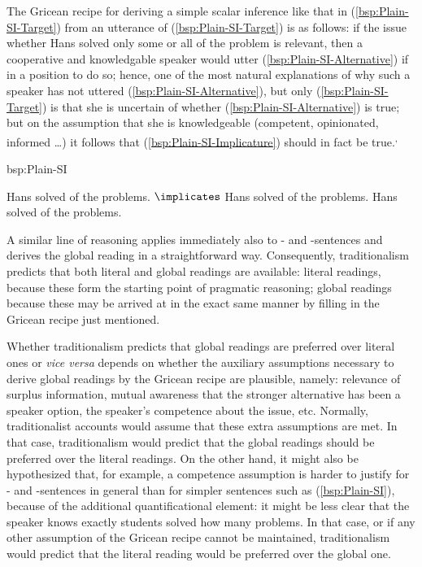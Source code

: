 \documentclass[fleqn,reqno,10pt,draft]{article}
\newcommand{\as}{\acro{as}}
\renewcommand{\es}{\acro{es}}
\newcommand{\mymark}[1]{{\color{mycol}{#1}}}
\begin{document}
The Gricean recipe for deriving a simple scalar inference like that in
(\ref{bsp:Plain-SI-Target}) from an utterance of
(\ref{bsp:Plain-SI-Target}) is as follows: if the issue whether Hans
solved only some or all of the problem is relevant, then a cooperative
and knowledgable speaker would utter (\ref{bsp:Plain-SI-Alternative})
if in a position to do so; hence, one of the most natural explanations
of why such a speaker has not uttered
(\ref{bsp:Plain-SI-Alternative}), but only (\ref{bsp:Plain-SI-Target})
is that she is uncertain of whether (\ref{bsp:Plain-SI-Alternative})
is true; but on the assumption that she is knowledgeable (competent,
opinionated, informed \dots) it follows that
(\ref{bsp:Plain-SI-Implicature}) should in fact be true.\textsuperscript{,}

\begin{exer}{bsp:Plain-SI}
  \ex 
    \begin{xlist}
      \ex \label{bsp:Plain-SI-Target} Hans solved \mymark{some} of the problems.
      \ex \label{bsp:Plain-SI-Implicature} $\implicates$ Hans solved
        \mymark{some but not all} of the problems.
      \ex Hans solved \mymark{all} of the problems.
    \end{xlist}
\end{exer}

A similar line of reasoning applies immediately also to \as- and
\es-sentences and derives the global reading in a straightforward
way. Consequently, traditionalism predicts that both literal and
global readings are available: literal readings, because these form
the starting point of pragmatic reasoning; global readings because
these may be arrived at in the exact same manner by filling in the
Gricean recipe just mentioned. 

Whether traditionalism predicts that global readings are preferred
over literal ones or \emph{vice versa} depends on whether the
auxiliary assumptions necessary to derive global readings by the
Gricean recipe are plausible, namely: relevance of surplus
information, mutual awareness that the stronger alternative has been a
speaker option, the speaker's competence about the issue,
etc. Normally, traditionalist accounts would assume that these extra
assumptions are met. In that case, traditionalism would predict that
the global readings should be preferred over the literal readings. On
the other hand, it might also be hypothesized that, for example, a
competence assumption is harder to justify for \as- and \es-sentences
in general than for simpler sentences such as (\ref{bsp:Plain-SI}),
because of the additional quantificational element: it might be less
clear that the speaker knows exactly students solved how many
problems. In that case, or if any other assumption of the Gricean
recipe cannot be maintained, traditionalism would predict that the
literal reading would be preferred over the global one.
\end{document}
